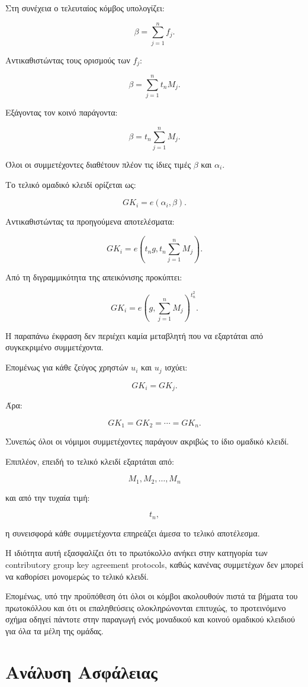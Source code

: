\documentclass[12pt,a4paper]{report}
\begin{document}
Στη συνέχεια ο τελευταίος κόμβος υπολογίζει:

\[
\beta=\sum_{j=1}^{n}f_j.
\]

Αντικαθιστώντας τους ορισμούς των $f_j$:

\[
\beta
=
\sum_{j=1}^{n}t_nM_j.
\]

Εξάγοντας τον κοινό παράγοντα:

\[
\beta
=
t_n\sum_{j=1}^{n}M_j.
\]

Όλοι οι συμμετέχοντες διαθέτουν πλέον τις ίδιες τιμές $\beta$ και $\alpha_i$.

Το τελικό ομαδικό κλειδί ορίζεται ως:

\[
GK_i=e(\alpha_i,\beta).
\]

Αντικαθιστώντας τα προηγούμενα αποτελέσματα:

\[
GK_i
=
e
\left(
t_ng,
t_n\sum_{j=1}^{n}M_j
\right).
\]

Από τη διγραμμικότητα της απεικόνισης προκύπτει:

\[
GK_i
=
e
\left(
g,
\sum_{j=1}^{n}M_j
\right)^{t_n^2}.
\]

Η παραπάνω έκφραση δεν περιέχει καμία μεταβλητή που να εξαρτάται από συγκεκριμένο συμμετέχοντα.

Επομένως για κάθε ζεύγος χρηστών $u_i$ και $u_j$ ισχύει:

\[
GK_i=GK_j.
\]

Άρα:

\[
GK_1
=
GK_2
=
\cdots
=
GK_n.
\]

Συνεπώς όλοι οι νόμιμοι συμμετέχοντες παράγουν ακριβώς το ίδιο ομαδικό κλειδί.

Επιπλέον, επειδή το τελικό κλειδί εξαρτάται από:

\[
M_1,M_2,\ldots,M_n
\]

και από την τυχαία τιμή:

\[
t_n,
\]

η συνεισφορά κάθε συμμετέχοντα επηρεάζει άμεσα το τελικό αποτέλεσμα.

Η ιδιότητα αυτή εξασφαλίζει ότι το πρωτόκολλο ανήκει στην κατηγορία των contributory group key agreement protocols, καθώς κανένας συμμετέχων δεν μπορεί να καθορίσει μονομερώς το τελικό κλειδί.

Επομένως, υπό την προϋπόθεση ότι όλοι οι κόμβοι ακολουθούν πιστά τα βήματα του πρωτοκόλλου και ότι οι επαληθεύσεις ολοκληρώνονται επιτυχώς, το προτεινόμενο σχήμα οδηγεί πάντοτε στην παραγωγή ενός μοναδικού και κοινού ομαδικού κλειδιού για όλα τα μέλη της ομάδας.

\section{Ανάλυση Ασφάλειας}
\end{document}
